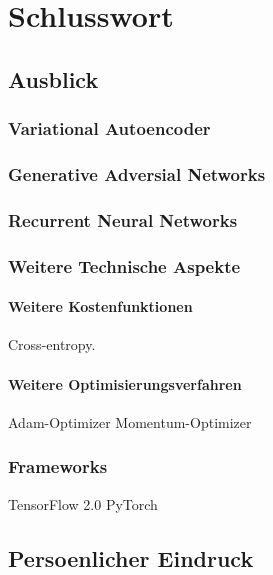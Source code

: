 \chapter*{Schlusswort}

\section*{Ausblick}
\subsection*{Variational Autoencoder}
\subsection*{Generative Adversial Networks}
\subsection*{Recurrent Neural Networks}
\subsection*{Weitere Technische Aspekte}
\subsubsection*{Weitere Kostenfunktionen}
Cross-entropy.
\subsubsection*{Weitere Optimisierungsverfahren}
Adam-Optimizer
Momentum-Optimizer

\subsection*{Frameworks}
TensorFlow 2.0
PyTorch



\section*{Persoenlicher Eindruck}


